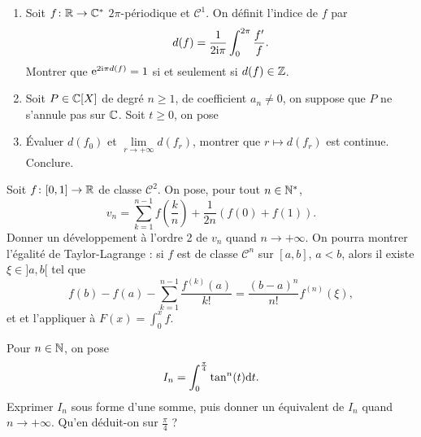 \documentclass[12pt]{article}
\begin{document}
\begin{exercise}
    \phantom{}
    \begin{enumerate}
        \item Soit $f\colon\mathbb{R}\to\mathbb{C}^{*}$ $2\pi$-périodique et $\mathcal{C}^{1}$. On définit l'indice de $f$ par 
        \begin{equation}
            d(f)=\frac{1}{2\mathrm{i}\pi}\int_{0}^{2\pi}\frac{f'}{f}.
        \end{equation}
        Montrer que $\mathrm{e}^{2\mathrm{i}\pi d(f)}=1$ si et seulement si $d(f)\in\mathbb{Z}$.
        
        \item Soit $P\in\mathbb{C}[X]$ de degré $n\geqslant1$, de coefficient $a_n\neq0$, on suppose que $P$ ne s'annule pas sur $\mathbb{C}$. Soit $t\geqslant0$, on pose 
        \item Évaluer $d(f_{0})$ et $\lim\limits_{r\to+\infty}d(f_{r})$, montrer que $r\mapsto d(f_{r})$ est continue. Conclure.
    \end{enumerate}
\end{exercise}

\begin{exercise}
    Soit $f\colon[0,1]\to\mathbb{R}$ de classe $\mathcal{C}^{2}$. On pose, pour tout $n\in\mathbb{N}^{*}$,
    \begin{equation}
        v_n=\sum_{k=1}^{n-1}f\left(\frac{k}{n}\right)+\frac{1}{2n}\left(f(0)+f(1)\right).
    \end{equation}
    Donner un développement à l'ordre 2 de $v_n$ quand $n\to+\infty$. On pourra montrer l'égalité de Taylor-Lagrange : si $f$ est de classe $\mathcal{C}^{n}$ sur $[a,b]$, $a<b$, alors il existe $\xi\in]a,b[$ tel que 
    \begin{equation}
        f(b)-f(a)-\sum_{k=1}^{n-1}\frac{f^{(k)}(a)}{k!}=\frac{(b-a)^{n}}{n!}f^{(n)}(\xi),
    \end{equation}
    et et l'appliquer à $F(x)=\int_{0}^{x}f$.
\end{exercise}

\begin{exercise}
    Pour $n\in\mathbb{N}$, on pose 
    \begin{equation}
        I_n=\int_{0}^{\frac{\pi}{4}}\tan^{n}(t)\mathrm{d} t.
    \end{equation}
    Exprimer $I_n$ sous forme d'une somme, puis donner un équivalent de $I_n$ quand $n\to+\infty$. Qu'en déduit-on sur $\frac{\pi}{4}$ ?
\end{exercise}
\end{document}
